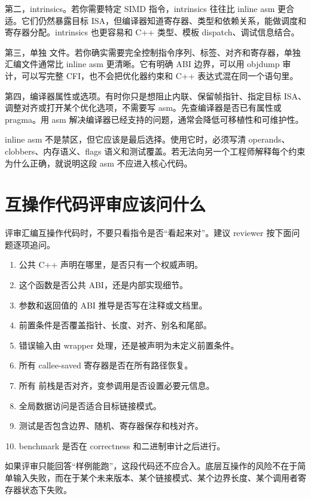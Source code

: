 第二，intrinsics。若你需要特定 SIMD 指令，intrinsics 往往比 inline asm 更合适。它们仍然暴露目标 ISA，但编译器知道寄存器、类型和依赖关系，能做调度和寄存器分配。intrinsics 也更容易和 C++ 类型、模板 dispatch、调试信息结合。

第三，单独  文件。若你确实需要完全控制指令序列、标签、对齐和寄存器，单独汇编文件通常比 inline asm 更清晰。它有明确 ABI 边界，可以用 objdump 审计，可以写完整 CFI，也不会把优化器约束和 C++ 表达式混在同一个语句里。

第四，编译器属性或选项。有时你只是想阻止内联、保留帧指针、指定目标 ISA、调整对齐或打开某个优化选项，不需要写 asm。先查编译器是否已有属性或 pragma。用 asm 解决编译器已经支持的问题，通常会降低可移植性和可维护性。

inline asm 不是禁区，但它应该是最后选择。使用它时，必须写清 operands、clobbers、内存语义、flags 语义和测试覆盖。若无法向另一个工程师解释每个约束为什么正确，就说明这段 asm 不应进入核心代码。

\section{互操作代码评审应该问什么}

评审汇编互操作代码时，不要只看指令是否“看起来对”。建议 reviewer 按下面问题逐项追问。

\begin{enumerate}
  \item 公共 C++ 声明在哪里，是否只有一个权威声明。
  \item 这个函数是否公共 ABI，还是内部实现细节。
  \item 参数和返回值的 ABI 推导是否写在注释或文档里。
  \item 前置条件是否覆盖指针、长度、对齐、别名和尾部。
  \item 错误输入由 wrapper 处理，还是被声明为未定义前置条件。
  \item 所有 callee-saved 寄存器是否在所有路径恢复。
  \item 所有  前栈是否对齐，变参调用是否设置必要元信息。
  \item 全局数据访问是否适合目标链接模式。
  \item 测试是否包含边界、随机、寄存器保存和栈对齐。
  \item benchmark 是否在 correctness 和二进制审计之后进行。
\end{enumerate}

如果评审只能回答“样例能跑”，这段代码还不应合入。底层互操作的风险不在于简单输入失败，而在于某个未来版本、某个链接模式、某个边界长度、某个调用者寄存器状态下失败。

